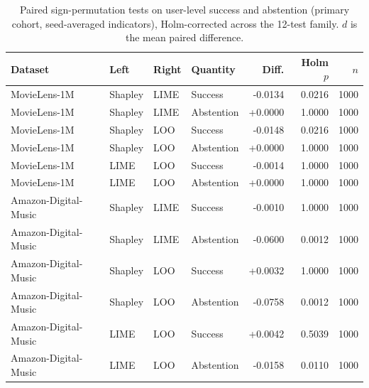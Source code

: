 \begin{table}[!htbp]\centering\scriptsize\setlength{\tabcolsep}{3pt}
\caption{Paired sign-permutation tests on user-level success and abstention
(primary cohort, seed-averaged indicators), Holm-corrected across the
12-test family. $d$ is the mean paired difference.}
\label{tab:success-abstention-tests}
\begin{tabular}{@{}llllrrr@{}}
\toprule
Dataset & Left & Right & Quantity & Diff. & Holm $p$ & $n$ \\
\midrule
MovieLens-1M & Shapley & LIME & Success & -0.0134 & 0.0216 & 1000 \\
MovieLens-1M & Shapley & LIME & Abstention & +0.0000 & 1.0000 & 1000 \\
MovieLens-1M & Shapley & LOO & Success & -0.0148 & 0.0216 & 1000 \\
MovieLens-1M & Shapley & LOO & Abstention & +0.0000 & 1.0000 & 1000 \\
MovieLens-1M & LIME & LOO & Success & -0.0014 & 1.0000 & 1000 \\
MovieLens-1M & LIME & LOO & Abstention & +0.0000 & 1.0000 & 1000 \\
Amazon-Digital-Music & Shapley & LIME & Success & -0.0010 & 1.0000 & 1000 \\
Amazon-Digital-Music & Shapley & LIME & Abstention & -0.0600 & 0.0012 & 1000 \\
Amazon-Digital-Music & Shapley & LOO & Success & +0.0032 & 1.0000 & 1000 \\
Amazon-Digital-Music & Shapley & LOO & Abstention & -0.0758 & 0.0012 & 1000 \\
Amazon-Digital-Music & LIME & LOO & Success & +0.0042 & 0.5039 & 1000 \\
Amazon-Digital-Music & LIME & LOO & Abstention & -0.0158 & 0.0110 & 1000 \\
\bottomrule
\end{tabular}
\end{table}

